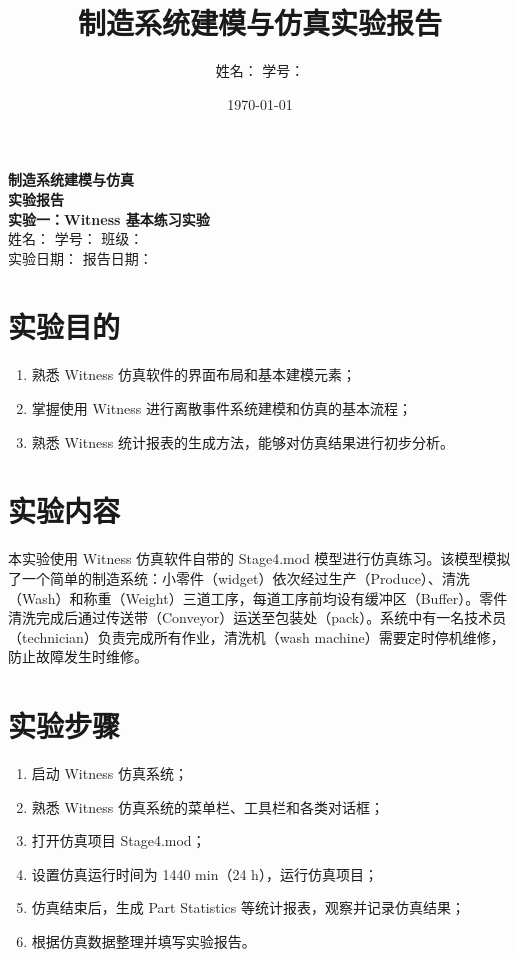 \documentclass[12pt, a4paper, UTF8]{ctexart}
\title{\heiti\zihao{2}制造系统建模与仿真实验报告}
\author{\kaishu\zihao{4}姓名：\underline{\qquad\qquad} \quad 学号：\underline{\qquad\qquad}}
\date{\kaishu\zihao{4}\today}
\begin{document}
\begin{titlepage}
    \centering
    \vspace*{2cm}
    {\heiti{}\textbf{制造系统建模与仿真}\\[0.5cm]
    \textbf{实验报告}}\\[2cm]
    {\kaishu{}\textbf{实验一：Witness 基本练习实验}}\\[3cm]
    {\songti{}
    姓名：\underline{\qquad\qquad\qquad} \quad
    学号：\underline{\qquad\qquad\qquad} \quad
    班级：\underline{\qquad\qquad\qquad}\\[1.5cm]
    实验日期：\underline{\qquad\qquad\qquad} \quad
    报告日期：\underline{\qquad\qquad\qquad}
    }
    \vfill
\end{titlepage}

\section{实验目的}
\begin{enumerate}
    \item 熟悉 Witness 仿真软件的界面布局和基本建模元素；
    \item 掌握使用 Witness 进行离散事件系统建模和仿真的基本流程；
    \item 熟悉 Witness 统计报表的生成方法，能够对仿真结果进行初步分析。
\end{enumerate}

\section{实验内容}
本实验使用 Witness 仿真软件自带的 Stage4.mod 模型进行仿真练习。该模型模拟了一个简单的制造系统：小零件（widget）依次经过生产（Produce）、清洗（Wash）和称重（Weight）三道工序，每道工序前均设有缓冲区（Buffer）。零件清洗完成后通过传送带（Conveyor）运送至包装处（pack）。系统中有一名技术员（technician）负责完成所有作业，清洗机（wash machine）需要定时停机维修，防止故障发生时维修。

\section{实验步骤}
\begin{enumerate}
    \item 启动 Witness 仿真系统；
    \item 熟悉 Witness 仿真系统的菜单栏、工具栏和各类对话框；
    \item 打开仿真项目 Stage4.mod；
    \item 设置仿真运行时间为 1440 min（24 h），运行仿真项目；
    \item 仿真结束后，生成 Part Statistics 等统计报表，观察并记录仿真结果；
    \item 根据仿真数据整理并填写实验报告。
\end{enumerate}
\end{document}
